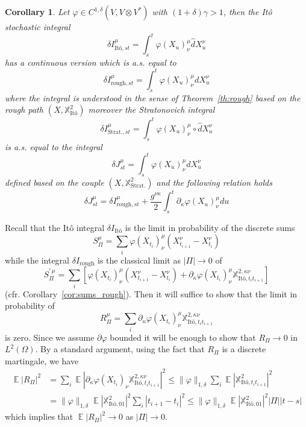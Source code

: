 \documentclass[a4paper,12pt,reqno]{amsproc}
\DeclareMathOperator{\expect}{{\mathbb E}}
\newcommand{\der}{\delta\!}
\newtheorem{corollary}{Corollary}
\begin{document}
\begin{corollary}
Let $\varphi \in C^{1,\delta}(V,V\otimes V^*)$ with $(1+\delta)\gamma > 1$, then the It\^o stochastic integral
$$
\der I_{\text{It\^o},st}^\mu = \int_s^t \varphi(X_u)^\mu_\nu \hat dX^\nu_u
$$
has a continuous version which is a.s. equal to
$$
\der I_{\text{rough},st}^\mu = \int_s^t \varphi(X_u)^\mu_\nu dX^\nu_u
$$
where the integral is understood in the sense of
Theorem~\ref{th:rough} based on the rough path
$(X,\mathbb{X}^2_{\text{It\^o}})$ moreover the Stratonovich integral
$$
\der I_{\text{Strat.},st}^\mu = \int_s^t \varphi(X_u)^\mu_\nu \circ
\hat dX^\nu_u
$$
is a.s. equal to the integral
$$
\der J_{st}^\mu = \int_s^t \varphi(X_u)^\mu_\nu dX^\nu_u
$$
defined based on the couple $(X,\mathbb{X}^2_{\text{Strat.}})$ and
the following relation holds
$$
\der J_{st}^\mu = \der I_{\text{rough},st}^\mu + \frac{g^{\nu\kappa}}{2}  \int_s^t \partial_\kappa \varphi(X_u)^\mu_\nu du
$$   
\end{corollary}
\proof
Recall that the It\^o integral $\der I_{\text{It\^o}}$ is the
limit in probability of the discrete sums
$$
S^\mu_\Pi = \sum_i \varphi(X_{t_i})^\mu_\nu (X^\nu_{t_{i+1}}-X^\nu_{t_i})
$$
while the integral $\der I_{\text{rough}}$ is the classical limit
as $|\Pi| \to 0$ of
$$
S^{\prime\,\mu}_\Pi = \sum_i \left[\varphi(X_{t_i})^\mu_\nu (X^\nu_{t_{i+1}}-X^\nu_{t_i})
+ \partial_\kappa \varphi(X_{t_i})^\mu_\nu \mathbb{X}^{2,\kappa\nu}_{\text{It\^o},t_i t_{i+1}}\right]
$$
(cfr. Corollary~\ref{cor:sums_rough}). Then it will suffice to show
that the limit in probability of
$$
R^\mu_\Pi = \sum_i \partial_\kappa \varphi(X_{t_i})^\mu_\nu \mathbb{X}^{2,\kappa\nu}_{\text{It\^o},t_i t_{i+1}}
$$
is zero. Since we assume $\partial \varphi$ bounded it will be enough to
show that $R_\Pi \to 0$ in $L^2(\Omega)$. By a standard argument, using the fact that $R_\Pi$
is a discrete martingale, we have
\begin{equation*}
  \begin{split}
\expect|R_\Pi|^2 & = \sum_i \expect |\partial_\kappa \varphi(X_{t_i})_\nu
\mathbb{X}^{2,\kappa\nu}_{\text{It\^o},t_i t_{i+1}}|^2      
 \le \|\varphi\|_{1,\delta} \sum_i \expect
|\mathbb{X}^{2}_{\text{It\^o},t_i t_{i+1}}|^2
\\& = \|\varphi\|_{1,\delta} \expect
|\mathbb{X}^{2}_{\text{It\^o},0 1}|^2 \sum_i |t_{i+1}-t_i|^2 
 \le \|\varphi\|_{1,\delta} \expect
|\mathbb{X}^{2}_{\text{It\^o},0 1}|^2 |\Pi| |t-s|
  \end{split}
\end{equation*}
which implies that $\expect|R_\Pi|^2 \to 0$ as $|\Pi| \to 0$.
\end{document}
